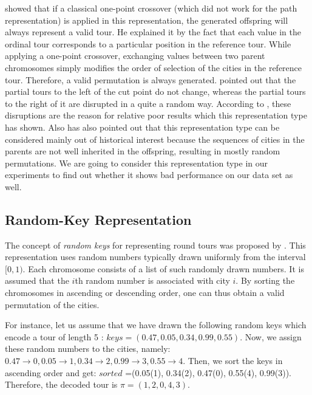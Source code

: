 \citeauthor{potvin1996genetic} \cite{potvin1996genetic}  showed that if a classical one-point crossover (which did not work for the path representation) is applied in this representation, the generated offspring will always represent a valid tour. He explained it by the fact that each value in the ordinal tour corresponds to a particular position in the reference tour. While applying a one-point crossover, exchanging values between two parent chromosomes simply modifies the order of selection of the cities in the reference tour. Therefore, a valid permutation is always generated. \citeauthor{larranaga1999genetic} \cite{larranaga1999genetic} pointed out that the partial tours to the left of the cut point do not change, whereas the partial tours to the right of it are disrupted in a quite a random way. According to \citeauthor{larranaga1999genetic} \cite{larranaga1999genetic}, these disruptions are the reason for relative poor results which this representation type has shown. Also \citeauthor{potvin1996genetic} \cite{potvin1996genetic} has also pointed out that this representation type can be considered mainly out of historical interest because the sequences of cities in the parents are not well inherited in the offspring, resulting in mostly random permutations. We are going to consider this representation type in our experiments to find out whether it shows bad performance on our data set as well. \par 

\subsection{Random-Key Representation}
\label{subsec:random_key}

The concept of \textit{random keys} for representing round tours was proposed by \citeauthor{bean1994genetic} \cite{bean1994genetic}. This representation uses random numbers typically drawn uniformly from the interval $[0, 1)$. Each chromosome consists of a list of such randomly drawn numbers. It is assumed that the $i$th random number is associated with city $i$. By sorting the chromosomes in ascending \cite{bean1994genetic} or descending \cite{knust2020script} order, one can thus obtain a valid permutation of the cities. \par

For instance, let us assume that we have drawn the following random keys which encode a tour of length 5 : $keys=(0.47, 0.05, 0.34, 0.99, 0.55)$. Now, we assign these random numbers to the cities, namely: $0.47 \rightarrow 0, 0.05 \rightarrow 1, 0.34 \rightarrow 2, 0.99 \rightarrow 3, 0.55 \rightarrow 4$. Then, we sort the keys in ascending order and get:
$sorted$ =(0.05(1), 0.34(2), 0.47(0), 0.55(4), 0.99(3)). Therefore, the decoded tour is $\pi = (1, 2, 0, 4, 3)$.\par 

